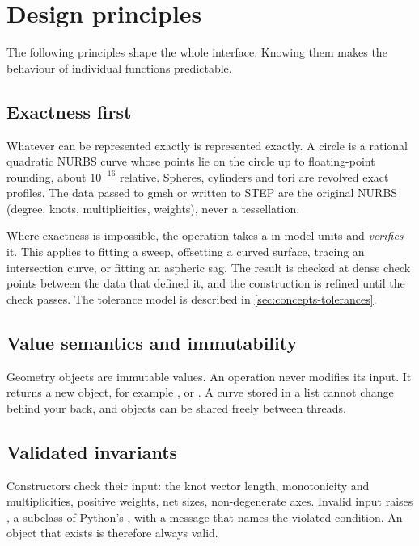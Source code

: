 \section{Design principles}\label{sec:intro-principles}

The following principles shape the whole interface. Knowing them makes the behaviour of
individual functions predictable.

\subsection{Exactness first}
Whatever can be represented exactly is represented exactly. A circle is a rational quadratic
NURBS curve whose points lie on the circle up to floating-point rounding, about $10^{-16}$
relative. Spheres, cylinders and tori are revolved exact profiles. The data passed to gmsh or
written to STEP are the original NURBS (degree, knots, multiplicities, weights), never a
tessellation.

Where exactness is impossible, the operation takes a  in model units and
\emph{verifies} it. This applies to fitting a sweep, offsetting a curved surface, tracing an
intersection curve, or fitting an aspheric sag. The result is checked at dense check points
between the data that defined it, and the construction is refined until the check passes. The
tolerance model is described in \cref{sec:concepts-tolerances}.

\subsection{Value semantics and immutability}
Geometry objects are immutable values. An operation never modifies its input. It returns a new
object, for example ,  or
. A curve stored in a list cannot change behind your back, and
objects can be shared freely between threads.

\subsection{Validated invariants}
Constructors check their input: the knot vector length, monotonicity and multiplicities,
positive weights, net sizes, non-degenerate axes. Invalid input raises
, a subclass of Python's , with a message that names
the violated condition. An object that exists is therefore always valid.

